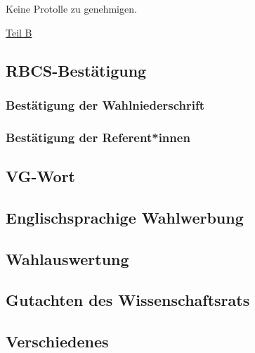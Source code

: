 \documentclass[ngerman,headheight=70pt]{scrartcl}
\begin{document}
    Keine Protolle zu genehmigen.

    \vspace{0.5cm}
    {\Large \underline{Teil B}}

    \subsection{RBCS-Bestätigung}

        \subsubsection{Bestätigung der Wahlniederschrift}

        \subsubsection{Bestätigung der Referent*innen}

    \subsection{VG-Wort}

    \subsection{Englischsprachige Wahlwerbung}

    \subsection{Wahlauswertung}

    \subsection{Gutachten des Wissenschaftsrats}

    \subsection{Verschiedenes}
\end{document}

